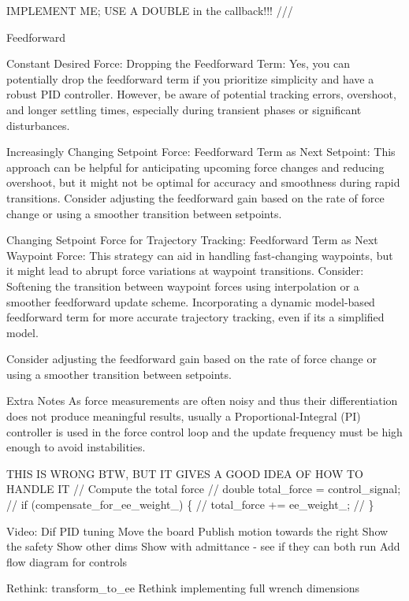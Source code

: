 IMPLEMENT ME; USE A DOUBLE in the callback!!! ///

Feedforward
\begin{DoxyEnumerate}
\item Constant Desired Force\+: Dropping the Feedforward Term\+: Yes, you can potentially drop the feedforward term if you prioritize simplicity and have a robust PID controller. However, be aware of potential tracking errors, overshoot, and longer settling times, especially during transient phases or significant disturbances.
\item Increasingly Changing Setpoint Force\+: Feedforward Term as Next Setpoint\+: This approach can be helpful for anticipating upcoming force changes and reducing overshoot, but it might not be optimal for accuracy and smoothness during rapid transitions. Consider adjusting the feedforward gain based on the rate of force change or using a smoother transition between setpoints.
\item Changing Setpoint Force for Trajectory Tracking\+: Feedforward Term as Next Waypoint Force\+: This strategy can aid in handling fast-\/changing waypoints, but it might lead to abrupt force variations at waypoint transitions. Consider\+: Softening the transition between waypoint forces using interpolation or a smoother feedforward update scheme. Incorporating a dynamic model-\/based feedforward term for more accurate trajectory tracking, even if it\textquotesingle{}s a simplified model.
\end{DoxyEnumerate}

Consider adjusting the feedforward gain based on the rate of force change or using a smoother transition between setpoints.

Extra Notes As force measurements are often noisy and thus their differentiation does not produce meaningful results, usually a Proportional-\/\+Integral (PI) controller is used in the force control loop and the update frequency must be high enough to avoid instabilities.

THIS IS WRONG BTW, BUT IT GIVES A GOOD IDEA OF HOW TO HANDLE IT // Compute the total force // double total\+\_\+force = control\+\_\+signal; // if (compensate\+\_\+for\+\_\+ee\+\_\+weight\+\_\+) \{ // total\+\_\+force += ee\+\_\+weight\+\_\+; // \}

Video\+: Dif PID tuning Move the board Publish motion towards the right Show the safety Show other dims Show with admittance -\/ see if they can both run Add flow diagram for controls

Rethink\+: transform\+\_\+to\+\_\+ee Rethink implementing full wrench dimensions

